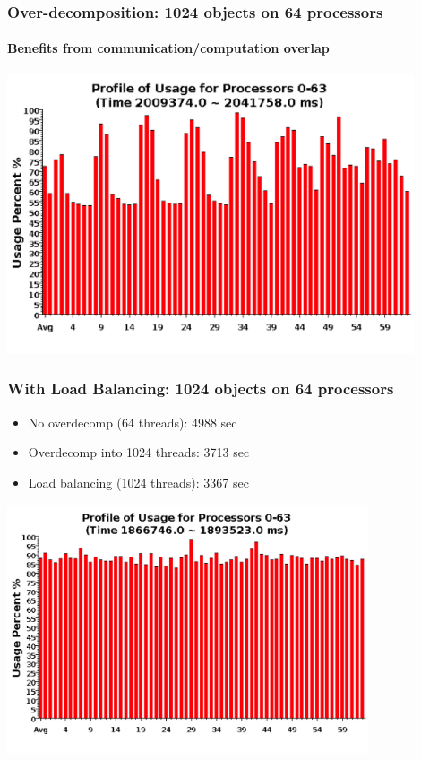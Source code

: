 \begin{frame}[fragile]
\frametitle{Over-decomposition: 1024 objects on 64 processors}
\framesubtitle{Benefits from communication/computation overlap}
\begin{center}\includegraphics[width=0.9\textwidth]{figures/usageVirtual.png}\end{center}
\end{frame}

\begin{frame}[fragile]
\frametitle{With Load Balancing: 1024 objects on 64 processors}
\begin{center}
\begin{itemize}
\item No overdecomp (64 threads): 4988 sec
\item Overdecomp into 1024 threads: 3713 sec
\item Load balancing (1024 threads): 3367 sec
\end{itemize}
\includegraphics[width=0.8\textwidth]{figures/usageLB.png}
\end{center}
\end{frame}
